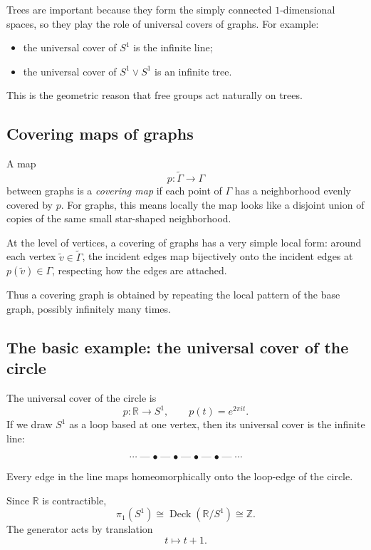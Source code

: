 \documentclass[12pt,a4paper]{article}
\DeclareMathOperator{\Deck}{Deck}
\theoremstyle{notespace}
\newcommand{\longdash}{\mathrel{\text{---}}}
\begin{document}
Trees are important because they form the simply connected \(1\)-dimensional spaces, so they play the role of universal covers of graphs. For example:

\begin{itemize}
	\item the universal cover of \(S^1\) is the infinite line;
	\item the universal cover of \(S^1\vee S^1\) is an infinite tree.
\end{itemize}

This is the geometric reason that free groups act naturally on trees.

\subsection{Covering maps of graphs}

A map
\[
p:\widetilde{\Gamma}\to \Gamma
\]
between graphs is a \emph{covering map} if each point of \(\Gamma\) has a neighborhood evenly covered by \(p\). For graphs, this means locally the map looks like a disjoint union of copies of the same small star-shaped neighborhood.

At the level of vertices, a covering of graphs has a very simple local form: around each vertex \(\widetilde v\in \widetilde\Gamma\), the incident edges map bijectively onto the incident edges at \(p(\widetilde v)\in \Gamma\), respecting how the edges are attached.

Thus a covering graph is obtained by repeating the local pattern of the base graph, possibly infinitely many times.

\subsection{The basic example: the universal cover of the circle}

The universal cover of the circle is
\[
p:\mathbb R\to S^1,
\qquad
p(t)=e^{2\pi i t}.
\]
If we draw \(S^1\) as a loop based at one vertex, then its universal cover is the infinite line:

\[
\cdots \longdash \bullet \longdash \bullet \longdash \bullet \longdash \bullet \longdash \cdots
\]

Every edge in the line maps homeomorphically onto the loop-edge of the circle.

Since \(\mathbb R\) is contractible,
\[
\pi_1(S^1)\cong \Deck(\mathbb R/S^1)\cong \mathbb Z.
\]
The generator acts by translation
\[
t\mapsto t+1.
\]
\end{document}
